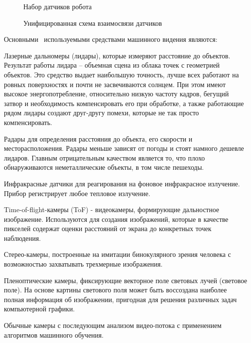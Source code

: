 \begin{figure}[ht]
    \caption{Набор датчиков робота}\label{fig:robot2}
\end{figure}

\begin{figure}[ht]
    \caption{Унифицированная схема взаимосвязи датчиков}\label{fig:sensors}
\end{figure}


Основными~\cite{confbib1} используемыми средствами машинного видения являются:

Лазерные дальномеры (лидары), которые измеряют расстояние до объектов. Результат работы лидара – объемная сцена из облака точек с геометрией объектов. Это средство выдает наибольшую точность, лучше всех работают на ровных поверхностях и почти не засвечиваются солнцем. При этом имеют высокое энергопотребление, относительно низкую частоту кадров, бегущий затвор и необходимость компенсировать его при обработке, а также работающие рядом лидары создают друг-другу помехи, которые не так просто компенсировать.

Радары для определения расстояния до объекта, его скорости и месторасположения. Радары меньше зависят от погоды и стоят намного дешевле лидаров. Главным отрицательным качеством является то, что плохо обнаруживаются неметаллические объекты, в том числе пешеходы.

Инфракрасные датчики для реагирования на фоновое инфракрасное излучение. Прибор регистрирует любое тепловое излучение.

Time-of-flight-камеры (ToF) - видеокамеры, формирующие дальностное изображение. Используются для создания изображений, которые в качестве пикселей содержат оценки расстояний от экрана до конкретных точек наблюдения.

Стерео-камеры, построенные на имитации бинокулярного зрения человека с возможностью захватывать трехмерные изображения.

Пленоптические камеры, фиксирующие векторное поле световых лучей (световое поле). На основе картины светового поля может быть воссоздана наиболее полная информация об изображении, пригодная для решения различных задач компьютерной графики.

Обычные камеры с последующим анализом видео-потока с применением алгоритмов машинного обучения.

